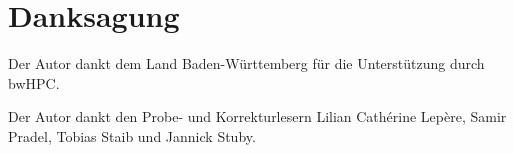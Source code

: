 \chapter*{Danksagung}

Der Autor dankt dem Land Baden-Württemberg für die Unterstützung durch bwHPC.

Der Autor dankt den Probe- und Korrekturlesern Lilian Cathérine Lepère, Samir Pradel, Tobias Staib und Jannick Stuby.